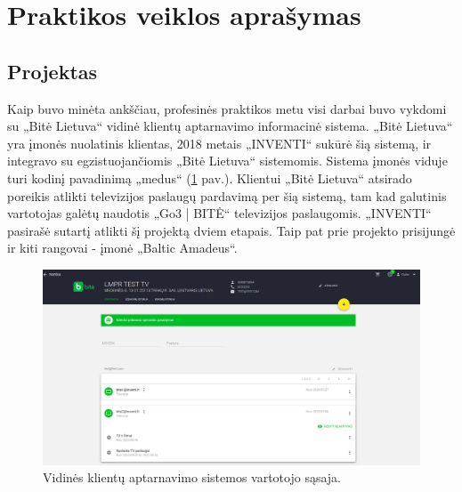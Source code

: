 \section{Praktikos veiklos aprašymas}

\subsection{Projektas}
Kaip buvo minėta ankščiau, profesinės praktikos metu visi darbai buvo vykdomi su „Bitė Lietuva“ vidinė klientų aptarnavimo informacinė sistema.
„Bitė Lietuva“ yra įmonės nuolatinis klientas, 2018 metais „INVENTI“ sukūrė šią sistemą\footnotemark[2], ir integravo su egzistuojančiomis „Bitė Lietuva“ sistemomis.
Sistema įmonės viduje turi kodinį pavadinimą „medus“ (\ref{img:medus} pav.).
Klientui „Bitė Lietuva“ atsirado poreikis atlikti televizijos paslaugų pardavimą per šią sistemą, tam kad galutinis vartotojas galėtų naudotis
„Go3 | BITĖ“ televizijos paslaugomis\footnotemark[3]. „INVENTI“ pasirašė sutartį atlikti šį projektą dviem etapais.
Taip pat prie projekto prisijungė ir kiti rangovai - įmonė „Baltic Amadeus“.


\begin{figure}[H]
    \centering
    \includegraphics[scale=0.25]{img/medus.png}
    \caption{Vidinės klientų aptarnavimo sistemos vartotojo sąsaja.}
    \label{img:medus}
\end{figure}

